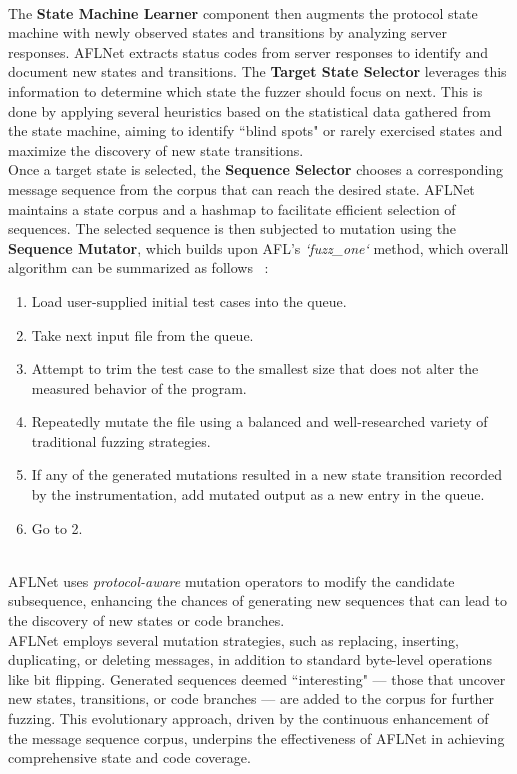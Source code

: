 \\The \textbf{State Machine Learner} component then augments the protocol state machine with newly observed states and transitions by analyzing server responses. AFLNet extracts status codes from server responses to identify and document new states and transitions. The \textbf{Target State Selector} leverages this information to determine which state the fuzzer should focus on next. This is done by applying several heuristics based on the statistical data gathered from the state machine, aiming to identify ``blind spots" or rarely exercised states and maximize the discovery of new state transitions.
\\Once a target state is selected, the \textbf{Sequence Selector} chooses a corresponding message sequence from the corpus that can reach the desired state. AFLNet maintains a state corpus and a hashmap to facilitate efficient selection of sequences. The selected sequence is then subjected to mutation using the \textbf{Sequence Mutator}, which builds upon AFL's \textit{`fuzz\_one`} method, which overall algorithm can be summarized as follows ~\cite{aflfuzzoneapproach}:
\begin{enumerate}
    \item Load user-supplied initial test cases into the queue.
    \item Take next input file from the queue.
    \item Attempt to trim the test case to the smallest size that does not alter the measured behavior of the program.
    \item Repeatedly mutate the file using a balanced and well-researched variety of traditional fuzzing strategies.
    \item If any of the generated mutations resulted in a new state transition recorded by the instrumentation, add mutated output as a new entry in the queue.
    \item Go to 2.
\end{enumerate}
\phantom{}\\
AFLNet uses \textit{protocol-aware} mutation operators to modify the candidate subsequence, enhancing the chances of generating new sequences that can lead to the discovery of new states or code branches.
\\AFLNet employs several mutation strategies, such as replacing, inserting, duplicating, or deleting messages, in addition to standard byte-level operations like bit flipping. Generated sequences deemed ``interesting" — those that uncover new states, transitions, or code branches — are added to the corpus for further fuzzing. This evolutionary approach, driven by the continuous enhancement of the message sequence corpus, underpins the effectiveness of AFLNet in achieving comprehensive state and code coverage.

